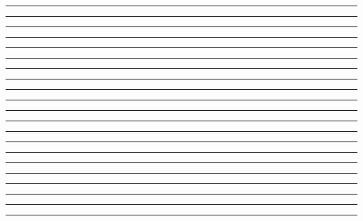 \documentclass{article}
\begin{document}
\newpage
\noindent{}\rule{1cm}{0.025cm}\framebox{\rule{1cm}{1cm}}

\newpage
\noindent{}\rule{1cm}{0.025cm}

\newpage
\noindent{}\rule{1cm}{0.025cm}

\newpage
\noindent{}\rule{1cm}{0.025cm}

\newpage
\noindent{}\rule{1cm}{0.025cm}

\newpage
\noindent{}\rule{1cm}{0.025cm}

\newpage
\noindent{}\rule{1cm}{0.025cm}\framebox{{\normalsize $\tau\,/\,\si{\second}$}}

\newpage
\noindent{}\rule{1cm}{0.025cm}

\newpage
\noindent{}\rule{1cm}{0.025cm}

\newpage
\noindent{}\rule{1cm}{0.025cm}

\newpage
\noindent{}\rule{1cm}{0.025cm}

\newpage
\noindent{}\rule{1cm}{0.025cm}

\newpage
\noindent{}\rule{1cm}{0.025cm}

\newpage
\noindent{}\rule{1cm}{0.025cm}

\newpage
\noindent{}\rule{1cm}{0.025cm}

\newpage
\noindent{}\rule{1cm}{0.025cm}

\newpage
\noindent{}\rule{1cm}{0.025cm}

\newpage
\noindent{}\rule{1cm}{0.025cm}

\newpage
\noindent{}\rule{1cm}{0.025cm}

\newpage
\noindent{}\rule{1cm}{0.025cm}

\newpage
\noindent{}\rule{1cm}{0.025cm}
\end{document}

